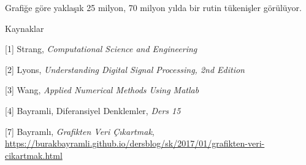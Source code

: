 \documentclass[12pt,fleqn]{article}\usepackage{../../common}
\begin{document}
Grafiğe göre yaklaşık 25 milyon, 70 milyon yılda bir rutin tükenişler görülüyor.


Kaynaklar

[1] Strang, {\em Computational Science and Engineering}

[2] Lyons, {\em Understanding Digital Signal Processing, 2nd Edition}

[3] Wang, {\em Applied Numerical Methods Using Matlab}

[4] Bayramli, Diferansiyel Denklemler, {\em Ders 15}

[7] Bayramlı, 
    {\em Grafikten Veri Çıkartmak}, 
    \url{https://burakbayramli.github.io/dersblog/sk/2017/01/grafikten-veri-cikartmak.html}
\end{document}
